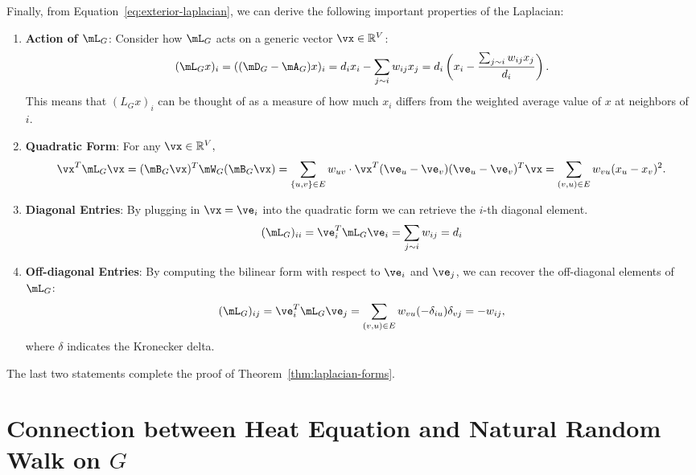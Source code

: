 Finally, from Equation~\ref{eq:exterior-laplacian}, we can derive the following important properties of the Laplacian:
\begin{enumerate}
    \item {\bf Action of $\mL_G$}: Consider how $\mL_G$ acts on a generic vector $\vx \in \R^V$:
    $$
    (\mL_G x)_i = ((\mD_G - \mA_G) x)_i = d_i x_i - \sum_{j \sim i} w_{ij} x_j = d_i \left(x_i - \frac{\sum_{j \sim i} w_{ij} x_j}{d_i}\right).
    $$
    This means that $(L_G x)_i$ can be thought of as a measure of how much $x_i$ differs from the weighted average value of $x$ at neighbors of $i.$ 


    \item {\bf Quadratic Form}: For any $\vx \in \R^V,$ 
    $$
    \vx^T \mL_G \vx  = (\mB_G \vx)^T \mW_G (\mB_G \vx) = \sum_{\{u,v\} \in E} w_{uv} \cdot \vx^T(\ve_u - \ve_v)(\ve_u - \ve_v)^T \vx = \sum_{(v, u) \in E} w_{vu} (x_u - x_v)^2.
    $$
    \item {\bf Diagonal Entries}: By plugging in $\vx = \ve_i$ into the quadratic form we can retrieve the $i$-th diagonal element.
$$
(\mL_G)_{ii} = \ve_i^T \mL_G \ve_i = \sum_{j \sim i} w_{ij} = d_i
$$
\item {\bf Off-diagonal Entries}: By computing the bilinear form with respect to $\ve_i$ and $\ve_j$, we can recover the off-diagonal elements of $\mL_G$:
$$
(\mL_G)_{ij}= \ve_i^T \mL_G \ve_j = \sum_{(v, u) \in E} w_{vu} (-\delta_{iu}) \delta_{vj} = -w_{ij},
$$
where $\delta$ indicates the Kronecker delta.
\end{enumerate}

The last two statements complete the proof of Theorem~\ref{thm:laplacian-forms}. 



\section{Connection between Heat Equation and Natural Random Walk on $G$}

